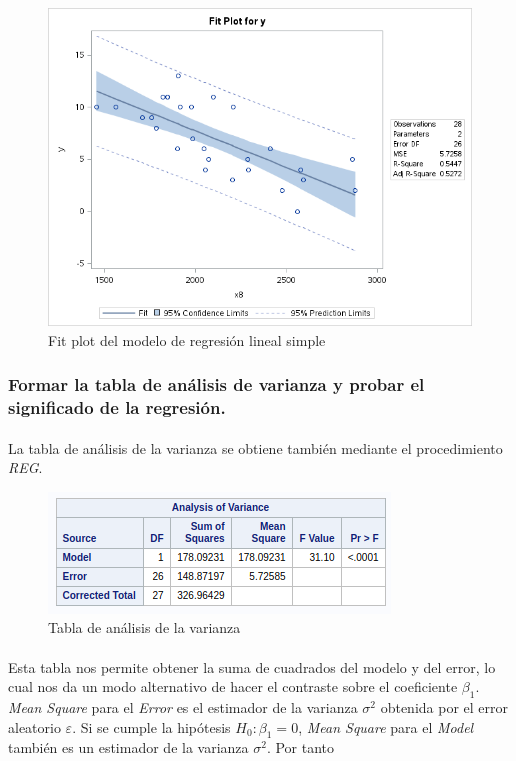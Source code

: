 \documentclass{article}
\begin{document}
  \begin{figure}[H]
    \centering
    \includegraphics[width=.8\linewidth]{img/montgomery/fitplot.png}
    \caption{Fit plot del modelo de regresión lineal simple}
    \label{img:mont-fitplot}
  \end{figure}

  \subsubsection{Formar la tabla de análisis de varianza y probar el significado de la regresión.}

  \paragraph{}
  La tabla de análisis de la varianza se obtiene también mediante el procedimiento \textit{REG}.

  \begin{figure}[H]
    \centering
    \includegraphics[width=.5\linewidth]{img/montgomery/anovatable.png}
    \caption{Tabla de análisis de la varianza}
    \label{img:mont-anova}
  \end{figure}

  \paragraph{}
  Esta tabla nos permite obtener la suma de cuadrados del modelo y del error, lo cual nos da un modo alternativo de hacer el contraste sobre el coeficiente $\beta_1$. \textit{Mean Square} para el \textit{Error} es el estimador de la varianza $\sigma^2$ obtenida por el error aleatorio $\varepsilon$. Si se cumple la hipótesis $H_0: \beta_1=0$, \textit{Mean Square} para el \textit{Model} también es un estimador de la varianza $\sigma^2$. Por tanto
\end{document}
